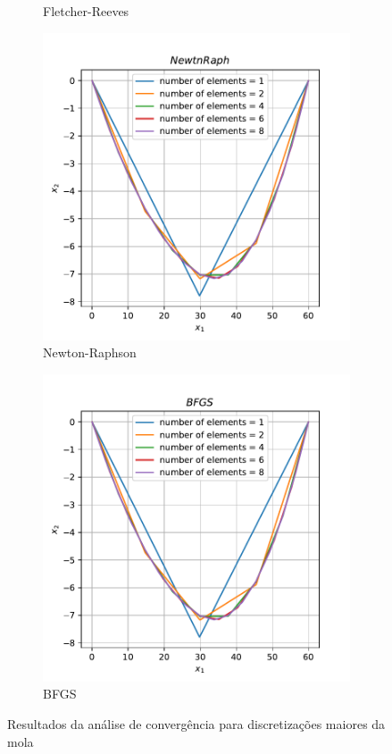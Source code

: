 \documentclass[10pt, a4paper]{article}
\begin{document}
\begin{figure}[htpb]
\begin{subfigure}[b]{0.32\textwidth}
    \caption{Fletcher-Reeves}
    \label{fig:q2b_fletchrvs}
  \end{subfigure}
  \hfill
  \begin{subfigure}[b]{0.32\textwidth}
    \centering
    \includegraphics[width=\textwidth]{images/q2b_NewtnRaph.pdf}
    \caption{Newton-Raphson}
    \label{fig:q2b_newtnraph}
  \end{subfigure}
  \hfill
  \begin{subfigure}[b]{0.32\textwidth}
    \centering
    \includegraphics[width=\textwidth]{images/q2b_BFGS.pdf}
    \caption{BFGS}
    \label{fig:q2b_bfgs}
  \end{subfigure}
     \caption{Resultados da análise de convergência para discretizações maiores da mola}
     \label{fig:q2b}
\end{figure}




\end{document}
